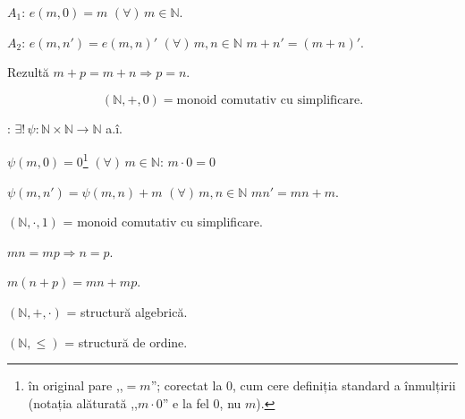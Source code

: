 \documentclass[12pt]{article}
\begin{document}
\noindent $A_1$: $e(m,0)=m$ $(\forall)\,m\in\mathbb{N}$.

\noindent $A_2$: $e(m,n')=e(m,n)'$ $(\forall)\,m,n\in\mathbb{N}$ \quad $m+n'=(m+n)'$.

\bigskip
\noindent Rezultă $m+p=m+n \Rightarrow p=n$.

\[
(\mathbb{N},+,0) = \text{monoid comutativ cu simplificare.}
\]

\bigskip
\noindent{}: $\exists!\, \psi:\mathbb{N}\times\mathbb{N}\to\mathbb{N}$ a.î.

\noindent $\psi(m,0)=0$\footnote{în original pare ,,$=m$''; corectat la $0$, cum cere definiția standard a înmulțirii (notația alăturată ,,$m\cdot 0$'' e la fel $0$, nu $m$).} $(\forall)\,m\in\mathbb{N}$: \quad $m\cdot 0=0$

\noindent $\psi(m,n')=\psi(m,n)+m$ $(\forall)\,m,n\in\mathbb{N}$ \quad $mn'=mn+m$.

\bigskip
\noindent $(\mathbb{N},\cdot,1)$ = monoid comutativ cu simplificare.

\noindent $mn=mp \Rightarrow n=p$.

\noindent $m(n+p)=mn+mp$.

\bigskip
\noindent $(\mathbb{N},+,\cdot)$ = structură algebrică.

\noindent $(\mathbb{N},\leq)$ = structură de ordine.
\end{document}

